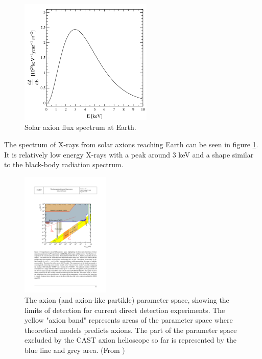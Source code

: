 \begin{figure}[htbp]
  \centering
    \includegraphics[height=6cm]{figures/cast/axion_spectrum.png}
  \caption{\footnotesize Solar axion flux spectrum at Earth. }
  \label{fig:axion_spectrum}
\end{figure}

The spectrum of X-rays from solar axions reaching Earth can be seen in figure \ref{fig:axion_spectrum}. It is relatively low energy X-rays with a peak around 3 keV and a shape similar to the black-body radiation spectrum.

\begin{figure}[htbp]
  \centering
    \includegraphics[height=6cm]{figures/cast/axion_search_cast2.pdf}
  \caption{\footnotesize The axion (and axion-like partikle) parameter space, showing the limits of detection for current direct detection experiments. The yellow "axion band" represents areas of the parameter space where theoretical models predicts axions. The part of the parameter space excluded by the CAST axion helioscope so far is represented by the blue line and grey area. (From \cite{Armengaud:2014eo})}
  \label{fig:axion_search_cast}
\end{figure}


